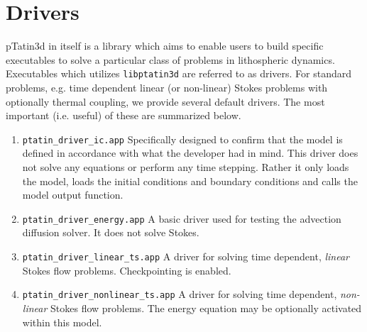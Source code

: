 \documentclass[paper=a4, fontsize=11pt,twoside]{scrartcl}
\newcommand{\ptat}{{pTatin3d}}
\newcommand{\unix}[1]{\texttt{\footnotesize #1}}
\begin{document}
{{%
\newpage
\section{Drivers}
{\ptat} in itself is a library which aims to enable users to build specific executables to solve a particular class of problems in lithospheric dynamics.
Executables which utilizes \unix{libptatin3d} are referred to as drivers.
For standard problems, e.g. time dependent linear (or non-linear) Stokes problems with optionally thermal coupling, we provide several default drivers.
The most important (i.e. useful) of these are summarized below.

\begin{enumerate}
	\item \unix{ptatin\_driver\_ic.app}
	Specifically designed to confirm that the model is defined in accordance with what the developer had in mind. This driver does not solve any equations or perform any time stepping. Rather it only loads the model, loads the initial conditions and boundary conditions and calls the model output function.
	
	\item \unix{ptatin\_driver\_energy.app}
	A basic driver used for testing the advection diffusion solver. It does not solve Stokes.
	
	\item \unix{ptatin\_driver\_linear\_ts.app}
	A driver for solving time dependent, {\it linear} Stokes flow problems. Checkpointing is enabled.

	\item \unix{ptatin\_driver\_nonlinear\_ts.app}
	A driver for solving time dependent, {\it non-linear} Stokes flow problems. The energy equation may be optionally activated within this model.
\end{enumerate}

}}
\end{document}
